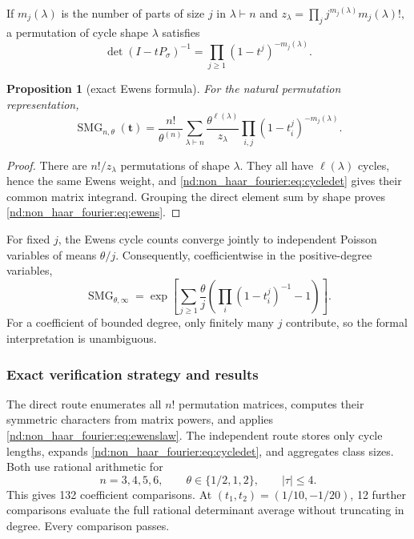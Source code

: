 \documentclass[10pt]{article}
\newcommand{\SMG}{\operatorname{SMG}}
\newcommand{\MGF}{\SMG}
\newtheorem{proposition}{Proposition}
\begin{document}
If $m_j(\lambda)$ is the number of parts of size $j$ in $\lambda\vdash n$
and $z_\lambda=\prod_jj^{m_j(\lambda)}m_j(\lambda)!$, a permutation of cycle
shape $\lambda$ satisfies
\begin{equation}\label{nd:non_haar_fourier:eq:cycledet}
 \det(I-tP_\sigma)^{-1}
 =\prod_{j\ge1}(1-t^j)^{-m_j(\lambda)}.
\end{equation}

\begin{proposition}[exact Ewens formula]\label{nd:non_haar_fourier:prop:ewens}
For the natural permutation representation,
\begin{equation}\label{nd:non_haar_fourier:eq:ewens}
 \boxed{\MGF_{n,\theta}(\mathbf t)
 =\frac{n!}{\theta^{(n)}}
  \sum_{\lambda\vdash n}\frac{\theta^{\ell(\lambda)}}{z_\lambda}
  \prod_{i,j}(1-t_i^j)^{-m_j(\lambda)}.}
\end{equation}
\end{proposition}

\begin{proof}
There are $n!/z_\lambda$ permutations of shape $\lambda$.  They all have
$\ell(\lambda)$ cycles, hence the same Ewens weight, and
\eqref{nd:non_haar_fourier:eq:cycledet} gives their common matrix integrand.  Grouping the direct
element sum by shape proves \eqref{nd:non_haar_fourier:eq:ewens}.
\end{proof}

For fixed $j$, the Ewens cycle counts converge jointly to independent
Poisson variables of means $\theta/j$.  Consequently, coefficientwise in the
positive-degree variables,
\begin{equation}\label{nd:non_haar_fourier:eq:ewenslimit}
 \MGF_{\theta,\infty}
 =\exp\!\left[\sum_{j\ge1}\frac{\theta}{j}
   \left(\prod_i(1-t_i^j)^{-1}-1\right)\right].
\end{equation}
For a coefficient of bounded degree, only finitely many $j$ contribute, so
the formal interpretation is unambiguous.

\subsubsection{Exact verification strategy and results}
The direct route enumerates all $n!$ permutation matrices, computes their
symmetric characters from matrix powers, and applies \eqref{nd:non_haar_fourier:eq:ewenslaw}.
The independent route stores only cycle lengths, expands
\eqref{nd:non_haar_fourier:eq:cycledet}, and aggregates class sizes.  Both use rational
arithmetic for
\begin{equation*}
 n=3,4,5,6,\qquad \theta\in\{1/2,1,2\},
 \qquad |\tau|\le4.
\end{equation*}
This gives 132 coefficient comparisons.  At
$(t_1,t_2)=(1/10,-1/20)$, 12 further comparisons evaluate the full rational
determinant average without truncating in degree.  Every comparison passes.
\end{document}
